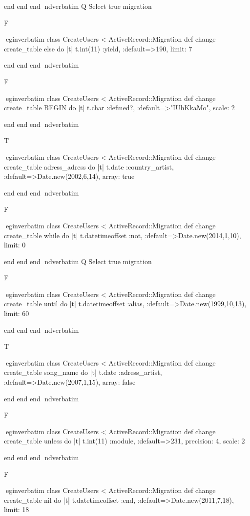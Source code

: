     end 
  end 
end
nd{verbatim}
Q
 Select true migration

F

egin{verbatim}
 class CreateUsers < ActiveRecord::Migration 
  def change 
    create_table else do |t| 
      t.int(11) :yield, :default=>190, limit: 7
    
    end 
  end 
end
nd{verbatim}

F

egin{verbatim}
 class CreateUsers < ActiveRecord::Migration 
  def change 
    create_table BEGIN do |t| 
      t.char :defined?, :default=>"IUhKkaMo", scale: 2
    
    end 
  end 
end
nd{verbatim}

T

egin{verbatim}
 class CreateUsers < ActiveRecord::Migration 
  def change 
    create_table adress_adress do |t| 
      t.date :country_artist, :default=>Date.new(2002,6,14), array: true
    
    end 
  end 
end
nd{verbatim}

F

egin{verbatim}
 class CreateUsers < ActiveRecord::Migration 
  def change 
    create_table while do |t| 
      t.datetimeoffset :not, :default=>Date.new(2014,1,10), limit: 0
    
    end 
  end 
end
nd{verbatim}
Q
 Select true migration

F

egin{verbatim}
 class CreateUsers < ActiveRecord::Migration 
  def change 
    create_table until do |t| 
      t.datetimeoffset :alias, :default=>Date.new(1999,10,13), limit: 60
    
    end 
  end 
end
nd{verbatim}

T

egin{verbatim}
 class CreateUsers < ActiveRecord::Migration 
  def change 
    create_table song_name do |t| 
      t.date :adress_artist, :default=>Date.new(2007,1,15), array: false
    
    end 
  end 
end
nd{verbatim}

F

egin{verbatim}
 class CreateUsers < ActiveRecord::Migration 
  def change 
    create_table unless do |t| 
      t.int(11) :module, :default=>231, precision: 4, scale: 2
    
    end 
  end 
end
nd{verbatim}

F

egin{verbatim}
 class CreateUsers < ActiveRecord::Migration 
  def change 
    create_table nil do |t| 
      t.datetimeoffset :end, :default=>Date.new(2011,7,18), limit: 18
    
